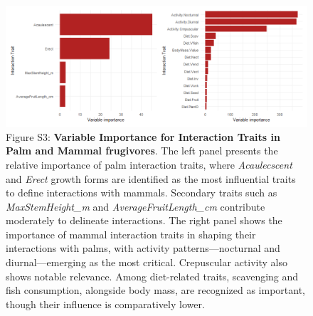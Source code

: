\documentclass[
]{agujournal2019}
\begin{document}
\begin{figure}[H]

{\centering \includegraphics{Sup_figures/00_Variable_importance.png}

}

\caption{Figure S3: \textbf{Variable Importance for Interaction Traits
in Palm and Mammal frugivores}. The left panel presents the relative
importance of palm interaction traits, where \emph{Acaulecscent} and
\emph{Erect} growth forms are identified as the most influential traits
to define interactions with mammals. Secondary traits such as
\emph{MaxStemHeight\_m} and \emph{AverageFruitLength\_cm} contribute
moderately to delineate interactions. The right panel shows the
importance of mammal interaction traits in shaping their interactions
with palms, with activity patterns---nocturnal and diurnal---emerging as
the most critical. Crepuscular activity also shows notable relevance.
Among diet-related traits, scavenging and fish consumption, alongside
body mass, are recognized as important, though their influence is
comparatively lower.}

\end{figure}%
\end{document}
